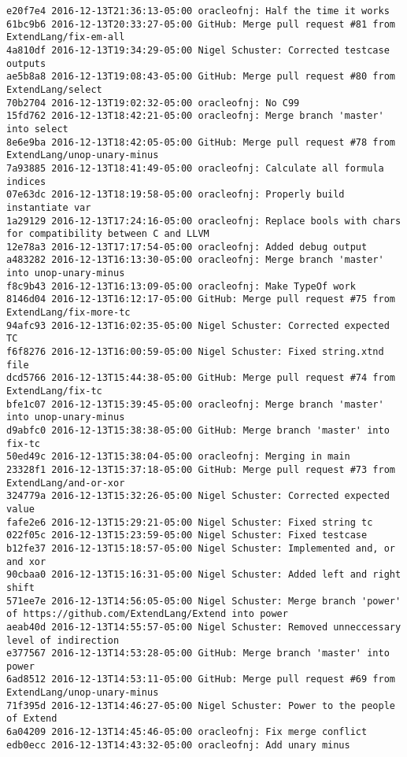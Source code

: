 \begin{lstlisting}
e20f7e4 2016-12-13T21:36:13-05:00 oracleofnj: Half the time it works
61bc9b6 2016-12-13T20:33:27-05:00 GitHub: Merge pull request #81 from ExtendLang/fix-em-all
4a810df 2016-12-13T19:34:29-05:00 Nigel Schuster: Corrected testcase outputs
ae5b8a8 2016-12-13T19:08:43-05:00 GitHub: Merge pull request #80 from ExtendLang/select
70b2704 2016-12-13T19:02:32-05:00 oracleofnj: No C99
15fd762 2016-12-13T18:42:21-05:00 oracleofnj: Merge branch 'master' into select
8e6e9ba 2016-12-13T18:42:05-05:00 GitHub: Merge pull request #78 from ExtendLang/unop-unary-minus
7a93885 2016-12-13T18:41:49-05:00 oracleofnj: Calculate all formula indices
07e63dc 2016-12-13T18:19:58-05:00 oracleofnj: Properly build instantiate var
1a29129 2016-12-13T17:24:16-05:00 oracleofnj: Replace bools with chars for compatibility between C and LLVM
12e78a3 2016-12-13T17:17:54-05:00 oracleofnj: Added debug output
a483282 2016-12-13T16:13:30-05:00 oracleofnj: Merge branch 'master' into unop-unary-minus
f8c9b43 2016-12-13T16:13:09-05:00 oracleofnj: Make TypeOf work
8146d04 2016-12-13T16:12:17-05:00 GitHub: Merge pull request #75 from ExtendLang/fix-more-tc
94afc93 2016-12-13T16:02:35-05:00 Nigel Schuster: Corrected expected TC
f6f8276 2016-12-13T16:00:59-05:00 Nigel Schuster: Fixed string.xtnd file
dcd5766 2016-12-13T15:44:38-05:00 GitHub: Merge pull request #74 from ExtendLang/fix-tc
bfe1c07 2016-12-13T15:39:45-05:00 oracleofnj: Merge branch 'master' into unop-unary-minus
d9abfc0 2016-12-13T15:38:38-05:00 GitHub: Merge branch 'master' into fix-tc
50ed49c 2016-12-13T15:38:04-05:00 oracleofnj: Merging in main
23328f1 2016-12-13T15:37:18-05:00 GitHub: Merge pull request #73 from ExtendLang/and-or-xor
324779a 2016-12-13T15:32:26-05:00 Nigel Schuster: Corrected expected value
fafe2e6 2016-12-13T15:29:21-05:00 Nigel Schuster: Fixed string tc
022f05c 2016-12-13T15:23:59-05:00 Nigel Schuster: Fixed testcase
b12fe37 2016-12-13T15:18:57-05:00 Nigel Schuster: Implemented and, or and xor
90cbaa0 2016-12-13T15:16:31-05:00 Nigel Schuster: Added left and right shift
571ee7e 2016-12-13T14:56:05-05:00 Nigel Schuster: Merge branch 'power' of https://github.com/ExtendLang/Extend into power
aeab40d 2016-12-13T14:55:57-05:00 Nigel Schuster: Removed unneccessary level of indirection
e377567 2016-12-13T14:53:28-05:00 GitHub: Merge branch 'master' into power
6ad8512 2016-12-13T14:53:11-05:00 GitHub: Merge pull request #69 from ExtendLang/unop-unary-minus
71f395d 2016-12-13T14:46:27-05:00 Nigel Schuster: Power to the people of Extend
6a04209 2016-12-13T14:45:46-05:00 oracleofnj: Fix merge conflict
edb0ecc 2016-12-13T14:43:32-05:00 oracleofnj: Add unary minus

\end{lstlisting}
